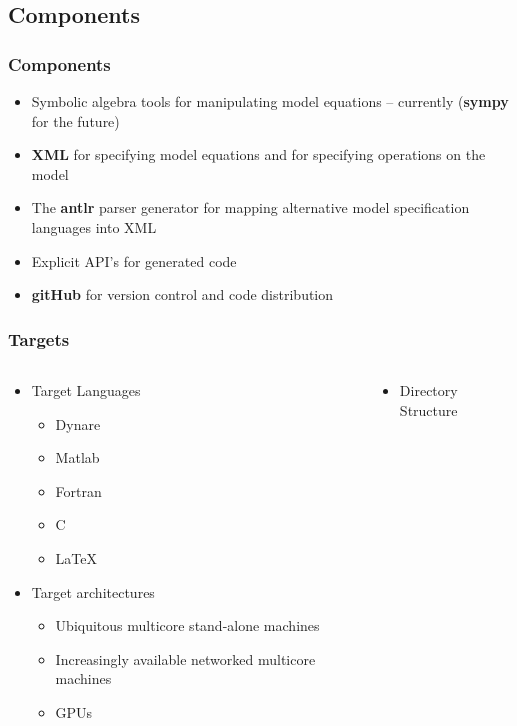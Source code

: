 \documentclass[tikz]{beamer}
\begin{document}
\subsection{Components}
\begin{frame}
  \frametitle{Components}  

{\small
  \begin{itemize}
\item Symbolic algebra tools for manipulating model equations
 -- currently {\bf \mma}  ({\bf sympy} for the future)
\item {\bf XML} for specifying model equations and 
for specifying operations on the model
\item The {\bf antlr} parser generator for mapping alternative 
model specification languages into  XML
\item Explicit  API's for generated code
\item {\bf gitHub} for version control and code distribution
  \end{itemize}

}
\end{frame}

\begin{frame}
  \frametitle{Targets}
  \begin{columns}
    \begin{column}{.5\linewidth}
      

  \begin{itemize}
\item Target Languages
    \begin{itemize}
    \item Dynare
    \item Matlab
    \item Fortran
    \item C
    \item \LaTeX
    \end{itemize}
\item Target architectures
  \begin{itemize}
\item Ubiquitous multicore stand-alone machines
  \item Increasingly available networked multicore machines
  \item GPUs
  \end{itemize}


  \end{itemize}
\end{column}
    \begin{column}{.5\linewidth}

      \begin{itemize}
      \item Directory Structure
      \end{itemize}





\end{column}

  \end{columns}


\end{frame}
\end{document}
